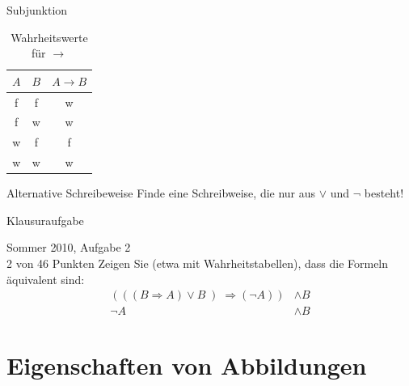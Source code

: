 \documentclass[18pt]{beamer}
\begin{document}
    \begin{frame}{Subjunktion}
        \begin{table}
            \caption{Wahrheitswerte für $\rightarrow$}
            \begin{center}
                \begin{tabular}{ccc}
                    \toprule
                    $A$ & $B$ & $A \rightarrow B$\\
                    \midrule
                    f & f & w\\
                    f & w & w\\
                    w & f & f\\
                    w & w & w\\
                    \bottomrule
                \end{tabular}
             \end{center}
        \end{table}
        \pause
        \begin{exampleblock}{Alternative Schreibeweise}
            Finde eine Schreibweise, die nur aus $\vee$ und $\neg$ besteht!\\
            \pause
        \end{exampleblock}
    \end{frame}

    \begin{frame}{Klausuraufgabe}
        \begin{exampleblock}{Sommer 2010, Aufgabe 2\\ 2 von 46 Punkten}
            Zeigen Sie (etwa mit Wahrheitstabellen), dass die Formeln äquivalent sind:
            \begin{align*}
                \left(\left(\left( B \Rightarrow A\right)\vee B\left) \Rightarrow \left(\neg A\right)\right) &\wedge B\\
                \neg A &\wedge B
            \end{align*}
        \end{exampleblock}
    \end{frame}

\section{Eigenschaften von Abbildungen}
\end{document}
